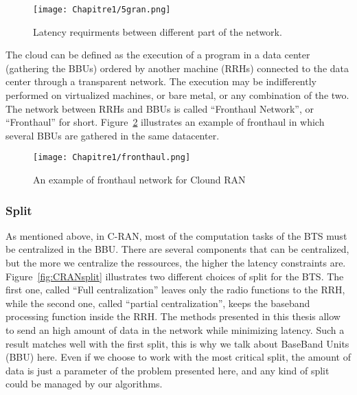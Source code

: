  \begin{figure}[h]
      \begin{center}
      \texttt{[image: Chapitre1/5gran.png]}
      \end{center}
      \caption{Latency requirments between different part of the network.}\label{fig:5gran}
      \end{figure}

The cloud can be defined as the execution of a program in a data center (gathering the BBUs) ordered by another machine (RRHs) connected to the data center through a transparent network.
 The execution may be indifferently performed on virtualized machines, or bare metal, or any combination of the two. The network between RRHs and BBUs is called “Fronthaul Network”, or “Fronthaul” for short. Figure~\ref{fig:fronthaul} illustrates an example of fronthaul in which several BBUs are gathered in the same datacenter. 

  \begin{figure}[h]
      \begin{center}
      \texttt{[image: Chapitre1/fronthaul.png]}
      \end{center}
      \caption{An example of fronthaul network for Clound RAN}\label{fig:fronthaul}
      \end{figure}
      
      \subsubsection{Split}

      As mentioned above, in C-RAN, most of the computation tasks of the BTS must be centralized in the BBU. There are several components that can be centralized, but the more we centralize the ressources, the higher the latency constraints are.
      Figure~\ref{fig:CRANsplit} illustrates two different choices of split for the BTS. The first one, called ``Full centralization'' leaves only the radio functions to the RRH, while the second one, called ``partial centralization'', keeps the baseband processing function inside the RRH. The methods presented in this thesis allow to send an high amount of data in the network while minimizing latency. Such a result matches well with the first split, this is why we talk about BaseBand Units (BBU) here. Even if we choose to work with the most critical split, the amount of data is just a parameter of the problem presented here, and any kind of split could be managed by our algorithms.
      
